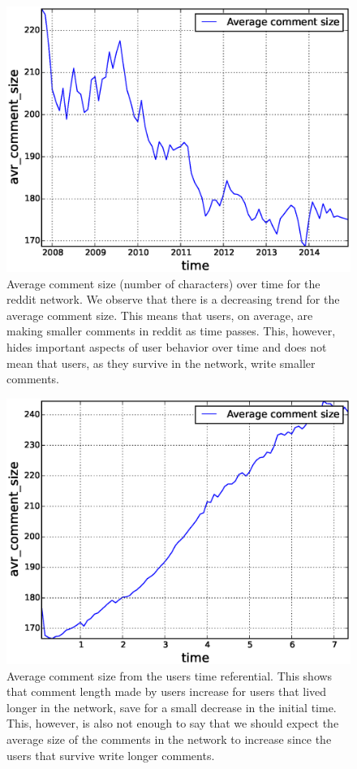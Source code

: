 \begin{figure}[!tb]
\centering
\includegraphics[scale=0.4]{./images/avr_comment_size_over_time_total.eps}
\caption{Average comment size (number of characters) over time for the reddit network. We observe that there is a decreasing trend for the average comment size. This means that users, on average, are making smaller comments in reddit as time passes. This, however, hides important aspects of user behavior over time and does not mean that users, as they survive in the network, write smaller comments.}
\label{fig:avr_comment_size_over_time_total}
\end{figure}

\begin{figure}[!tb]
\centering
\includegraphics[scale=0.4]{./images/avr_comment_size_user_ref_total.eps}
\caption{Average comment size from the users time referential. This shows that comment length made by users increase for users that lived longer in the network, save for a small decrease in the initial time. This, however, is also not enough to say that we should expect the average size of the comments in the network to increase since the users that survive write longer comments.}
\label{fig:avr_comment_size_user_ref_total}
\end{figure}

